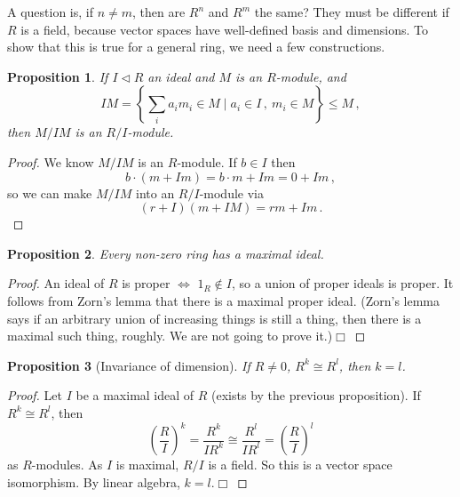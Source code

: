 \documentclass{article}
\theoremstyle{plain}\theoremheaderfont{\normalfont\itshape}\theorembodyfont{\rmfamily}\theoremseparator{.}\newtheorem*{rem}{Remark}\newtheorem*{ex}{Example}\newtheorem*{proof}{Proof}\newtheorem*{altp}{Alternative proof}\newtheorem*{nonex}{Non-Example}
\theoremstyle{plain}\theoremheaderfont{\normalfont\bfseries}\theorembodyfont{\rmfamily}\theoremseparator{.}\newtheorem{thm}{Theorem}[section]\newtheorem{lem}[thm]{Lemma}\newtheorem{prop}[thm]{Proposition}\newtheorem*{cor}{Corollary}\newtheorem{defn}[thm]{Definition}\newtheorem{clm}[thm]{Claim}\newtheorem{clminproof}{Claim}\newtheorem*{notn}{Notation}\newtheorem*{exer}{Exercise}\newtheorem*{lemnn}{Lemma}
\theoremstyle{break}\theoremheaderfont{\normalfont\itshape}\theorembodyfont{\rmfamily}\theoremseparator{.\medskip}\newtheorem*{proofskip}{Proof}\newtheorem*{exs}{Examples}\newtheorem*{rems}{Remarks}\newtheorem*{obs}{Observations}
\theoremstyle{break}\theoremheaderfont{\normalfont\bfseries}\theorembodyfont{\rmfamily}\theoremseparator{.\medskip}\newtheorem{lemskip}[thm]{Lemma}\newtheorem{defnskip}[thm]{Definition}\newtheorem{propskip}[thm]{Proposition}\newtheorem{thmskip}[thm]{Theorem}
\numberwithin{equation}{section}
\newcommand{\qed}{\hfill\ensuremath{\Box}}
\begin{document}
    A question is, if \(n\ne m\), then are \(R^n\) and \(R^m\) the same? They must be different if \(R\) is a field, because vector spaces have well-defined basis and dimensions. To show that this is true for a general ring, we need a few constructions.
    \begin{prop}
        If \(I\lhd R\) an ideal and \(M\) is an \(R\)-module, and
        \[IM=\left\{\sum_ia_im_i\in M\mid a_i\in I\,,\ m_i\in M\right\}\le M\,,\]
        then \(M/IM\) is an \(R/I\)-module.
    \end{prop}
    \begin{proof}
        We know \(M/IM\) is an \(R\)-module. If \(b\in I\) then
        \[b\cdot(m+Im)=b\cdot m+Im=0+Im\,,\]
        so we can make \(M/IM\) into an \(R/I\)-module via
        \[(r+I)(m+IM)=rm+Im\,.\]
    \end{proof}
    \begin{prop}
        Every non-zero ring has a maximal ideal.
    \end{prop}
    \begin{proof}
        An ideal of \(R\) is proper \(\iff\) \(1_R\notin I\), so a union of proper ideals is proper. It follows from Zorn's lemma that there is a maximal proper ideal. (Zorn's lemma says if an arbitrary union of increasing things is still a thing, then there is a maximal such thing, roughly. We are not going to prove it.)\qed
    \end{proof}
    \begin{prop}[Invariance of dimension]
        If \(R\ne 0\), \(R^k\cong R^l\), then \(k=l\).
    \end{prop}
    \begin{proof}
        Let \(I\) be a maximal ideal of \(R\) (exists by the previous proposition). If \(R^k\cong R^l\), then
        \[\left(\frac{R}{I}\right)^{k}=\frac{R^k}{IR^k}\cong\frac{R^l}{IR^l}=\left(\frac{R}{I}\right)^{l}\]
        as \(R\)-modules. As \(I\) is maximal, \(R/I\) is a field. So this is a vector space isomorphism. By linear algebra, \(k=l\).\qed
    \end{proof}
\end{document}
